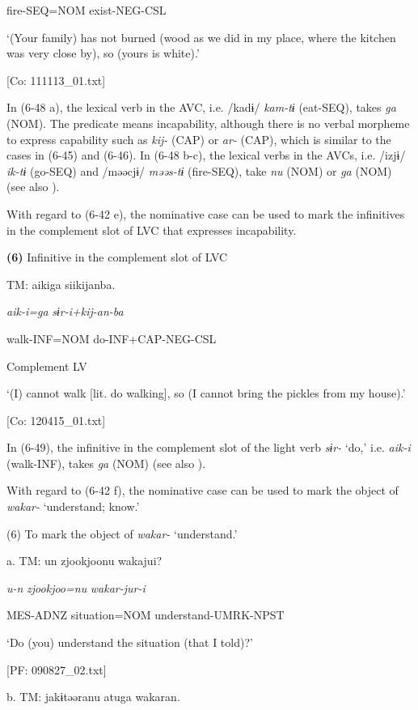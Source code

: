       fire-SEQ=NOM  exist-NEG-CSL

      ‘(Your family) has not burned (wood as we did in my place, where the kitchen was very close by), so (yours is white).’

      [Co: 111113\_01.txt]

In (6-48 a), the lexical verb in the AVC, i.e. /kadɨ/ \textit{kam-tɨ} (eat-SEQ), takes \textit{ga} (NOM). The predicate means incapability, although there is no verbal morpheme to express capability such as \textit{kij-} (CAP) or \textit{ar-} (CAP), which is similar to the cases in (6-45) and (6-46). In (6-48 b-c), the lexical verbs in the AVCs, i.e. /izjɨ/ \textit{ik-tɨ} (go-SEQ) and /məəcjɨ/ \textit{məəs-tɨ} (fire-SEQ), take \textit{nu} (NOM) or \textit{ga} (NOM) (see also ).

With regard to (6-42 e), the nominative case can be used to mark the infinitives in the complement slot of LVC that expresses incapability.

\textbf{(6)}  Infinitive in the complement slot of LVC

  TM:  aikiga  siikijanba.

    \textit{aik-i=ga}  \textit{sɨr-i+kij-an-ba}

    walk-INF=NOM  do-INF+CAP-NEG-CSL

    Complement  LV

    ‘(I) cannot walk [lit. do walking], so (I cannot bring the pickles from my house).’

  [Co: 120415\_01.txt]

In (6-49), the infinitive in the complement slot of the light verb \textit{sɨr-} ‘do,’ i.e. \textit{aik-i} (walk-INF), takes \textit{ga} (NOM) (see also ).

  With regard to (6-42 f), the nominative case can be used to mark the object of \textit{wakar-} ‘understand; know.’

(6)  To mark the object of \textit{wakar-} ‘understand.’

  a.  TM:  un  {\textbar}zjookjoo{\textbar}nu  wakajui?

      \textit{u-n}  \textit{zjookjoo=nu}  \textit{wakar-jur-i}

      MES-ADNZ  situation=NOM  understand-UMRK-NPST

      ‘Do (you) understand the situation (that I told)?’

      [PF: 090827\_02.txt]

  b.  TM:  jakɨtəəranu  atuga  wakaran.

